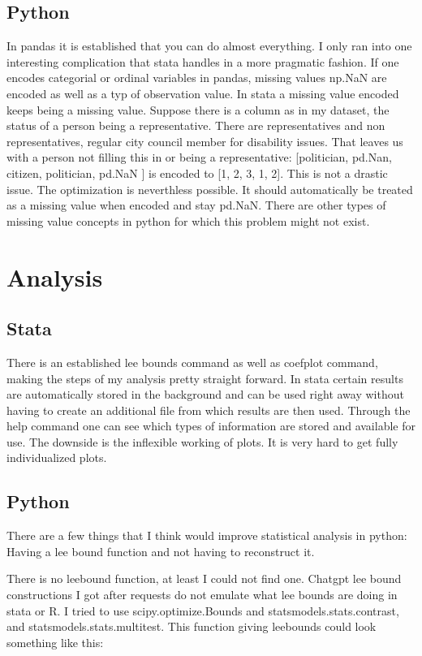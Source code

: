 \documentclass[10pt]{article}
\begin{document}
\subsection{Python}
In pandas it is established that you can do almost everything. I only ran into one interesting complication that
stata handles in a more pragmatic fashion.
If one encodes categorial or ordinal variables in pandas, missing values np.NaN are encoded as well as a typ of observation
value. In stata a missing value encoded keeps being a missing value. Suppose there is a column as in my dataset, 
the status of a person being a representative. There are representatives and non representatives, regular city 
council member for disability issues. That leaves us with a person not filling this in or being a representative:
[politician, pd.Nan, citizen, politician, pd.NaN ] is encoded to [1, 2, 3, 1, 2].
This is not a drastic issue. The optimization is neverthless possible.
It should automatically be treated as a missing value when encoded and stay pd.NaN. 
There are other types of missing value concepts in python for which this problem might not exist. 

\section{Analysis}

\subsection{Stata}
There is an established lee bounds command as well as coefplot command, making the steps of my analysis pretty straight forward. 
In stata certain results are automatically stored in the background and can be used right away without having to create
an additional file from which results are then used. Through the help command one can see which types of information
are stored and available for use.
The downside is the inflexible working of plots. It is very hard to get fully individualized plots.

\subsection{Python}
There are a few things that I think would improve statistical analysis in python:
Having a lee bound function and not having to reconstruct it.

There is no leebound function, at least I could not find one. Chatgpt lee bound constructions I got after 
requests do not emulate what lee bounds are doing in stata or R. I tried to use scipy.optimize.Bounds
and statsmodels.stats.contrast, and statsmodels.stats.multitest.
This function giving leebounds could look something like this:
\end{document}
